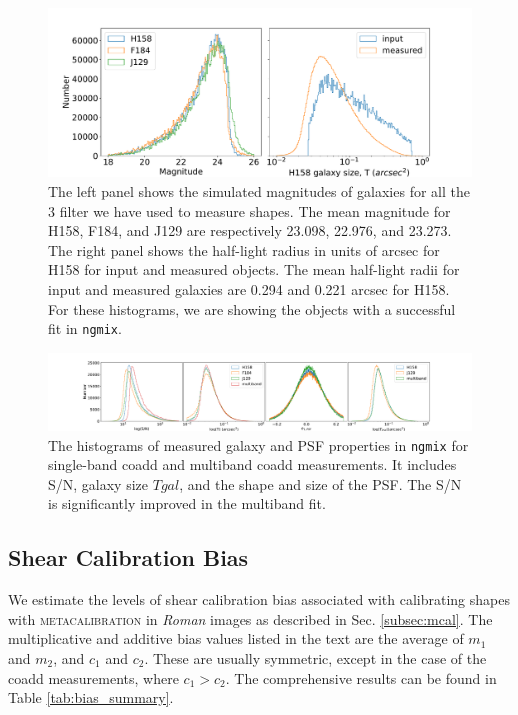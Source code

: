 \documentclass[fleqn,usenatbib]{mnras}
\begin{document}
\begin{figure}
    \hspace*{-1.5cm}
	\includegraphics[scale=0.3]{true_properties.pdf}
	\centering
    \caption{The left panel shows the simulated magnitudes of galaxies for all the 3 filter we have used to measure shapes. The mean magnitude for H158, F184, and J129 are respectively 23.098, 22.976, and 23.273. The right panel shows the half-light radius in units of arcsec for H158 for input and measured objects. The mean half-light radii for input and measured galaxies are 0.294 and 0.221 arcsec for H158. For these histograms, we are showing the objects with a successful fit in \texttt{ngmix}.}
    \label{fig:true_properties}
\end{figure}

\begin{figure}
    \hspace*{-3.0cm}
    \centering
	\includegraphics[scale=0.34]{ngmix_snr_T.pdf}
    \caption{The histograms of measured galaxy and PSF properties in \texttt{ngmix} for single-band coadd and multiband coadd measurements. It includes S/N, galaxy size $T{gal}$, and the shape and size of the PSF. The S/N is significantly improved in the multiband fit.}
    \label{fig:measured_properties}
\end{figure}


\subsection{Shear Calibration Bias}
\label{subsec:shapes}
We estimate the levels of shear calibration bias associated with calibrating shapes with \textsc{metacalibration} in \emph{Roman} images as described in Sec. \ref{subsec:mcal}. The multiplicative and additive bias values listed in the text are the average of $m_{1}$ and $m_{2}$, and $c_{1}$ and $c_{2}$. These are usually symmetric, except in the case of the coadd measurements, where $c_1>c_2$. The comprehensive results can be found in Table \ref{tab:bias_summary}.  
\end{document}
